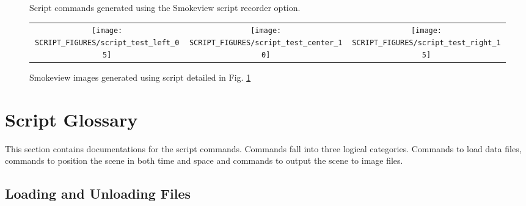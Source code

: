 \documentclass[11pt,twoside]{book}
\newcommand{\hitem}[1]{\item[{\bf #1} \hfill]}
\begin{document}
\begin{figure}[bph]
\caption{Script commands generated using the Smokeview script recorder option.}
\label{figscripttext}%
\end{figure}


\begin{figure}[bph]
\begin{center}
\begin{tabular}{ccc}
 \texttt{[image: SCRIPT\_FIGURES/script\_test\_left\_05]}&
 \texttt{[image: SCRIPT\_FIGURES/script\_test\_center\_10]}&
 \texttt{[image: SCRIPT\_FIGURES/script\_test\_right\_15]}\\
  \end{tabular}
\end{center}
 \caption{Smokeview images generated using script detailed in
 Fig. \ref{figscripttext}}
\label{figscriptimages}%
\end{figure}

\section{Script Glossary}

This section contains documentations for the script commands.
Commands fall into three logical categories.  Commands
to load data files, commands to position the scene in both time and space
and commands to output the scene to image files.










\subsection{Loading and Unloading  Files}
\end{document}

